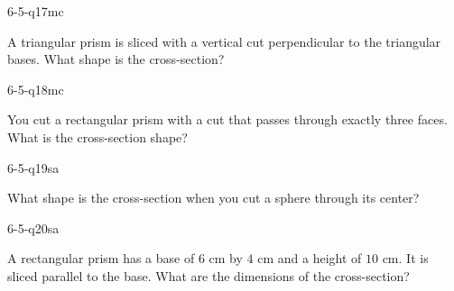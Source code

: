 \begin{practiceQuestion}{6-5-q17}{mc}
\begin{questionText}
A triangular prism is sliced with a vertical cut perpendicular to the triangular bases. What shape is the cross-section?
\end{questionText}
\end{practiceQuestion}

\begin{practiceQuestion}{6-5-q18}{mc}
\begin{questionText}
You cut a rectangular prism with a cut that passes through exactly three faces. What is the cross-section shape?
\end{questionText}
\end{practiceQuestion}


\begin{practiceQuestion}{6-5-q19}{sa}
\begin{questionText}
What shape is the cross-section when you cut a sphere through its center?
\end{questionText}
\end{practiceQuestion}

\begin{practiceQuestion}{6-5-q20}{sa}
\begin{questionText}
A rectangular prism has a base of $6$ cm by $4$ cm and a height of $10$ cm. It is sliced parallel to the base. What are the dimensions of the cross-section?
\end{questionText}
\end{practiceQuestion}

